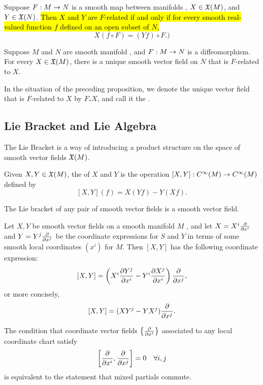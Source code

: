\setcounter{thm}{15}

\begin{prop}
Suppose $F:M\rightarrow N$ is a smooth map between manifolds \wowob, $X\in \mathfrak{X}(M)$, and $Y\in \mathfrak{X}(N)$. \hl{Then $X$ and $Y$ are $F$-related if and only if for every smooth real-valued function $f$ defined on an open subset of $N$,}
\[X(f\circ F) = (Yf)\circ F.)\]
\end{prop}

\setcounter{thm}{18}

\begin{prop}
Suppose $M$ and $N$ are smooth manifold \wowob, and $F:M\rightarrow N$ is a diffeomorphism. For every $X\in \mathfrak{X}(M)$, there is a unique smooth vector field on $N$ that is $F$-related to $X$.
\end{prop}

\dfn In the situation of the preceding proposition, we denote the unique vector field that is $F$-related to $X$ by $F_*X$, and call it the .


\subsection{Lie Bracket and Lie Algebra}\nl

The Lie Bracket is a way of introducing a product structure on the space of smooth vector fields $\mathfrak{X}(M)$.

\dfn Given $X,Y\in \mathfrak{X}(M)$, the  of $X$ and $Y$ is the operation $[X,Y]:C^\infty(M)\rightarrow C^\infty(M)$ defined by
\[[X,Y](f) = X(Yf) - Y(Xf).\]

\setcounter{thm}{24}

\begin{lem}
The Lie bracket of any pair of smooth vector fields is a smooth vector field.
\end{lem}

\begin{prop}
Let $X,Y$ be smooth vector fields on a smooth manifold $M$ \wowob, and let $X = X^i\frac{\partial}{\partial x^i}$ and $Y = Y^j\frac{\partial}{\partial x^j}$ be the coordinate expressions for $S$ and $Y$ in terms of some smooth local coordinates $(x^i)$ for $M$. Then $[X,Y]$ has the following coordinate expression:
\[[X,Y] = \left( X^i\frac{\partial{Y^j}}{\partial{x^i}} - Y^i\frac{\partial{X^j}}{\partial{x^i}}\right) \frac{\partial}{\partial x^j},\]
or more concisely,
\[[X,Y] = (XY^j - YX^j)\frac{\partial}{\partial x^j}.\]
\end{prop}

\crly The condition that coordinate vector fields $\left\{\frac{\partial}{\partial x^i}\right\}$ associated to any local coordinate chart satisfy
\[\left[ \frac{\partial}{\partial x^i},\frac{\partial}{\partial x^j}\right] = 0 \quad\forall i,j\]
is equivalent to the statement that mixed partials commute.

